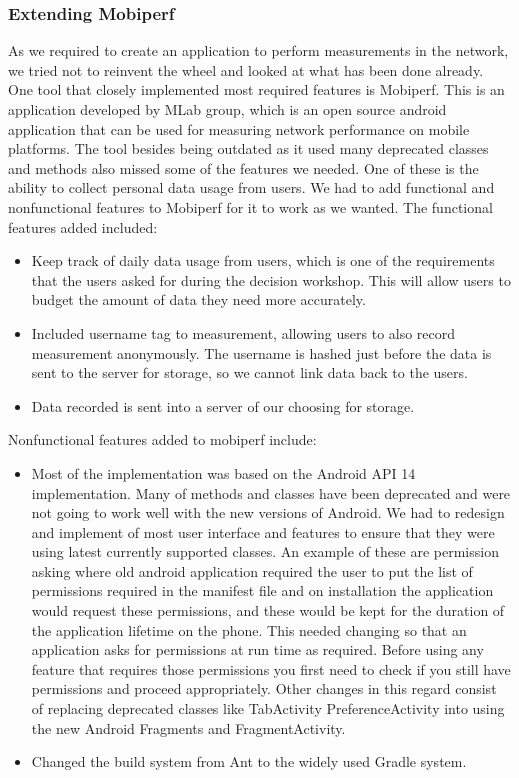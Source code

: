 \subsubsection{Extending Mobiperf}
As we required to create an application to perform measurements in the network, we tried not to reinvent the wheel and looked at what has been done already.
One tool that closely implemented most required features is Mobiperf\cite{mobiperf}.
This is an application developed by MLab group, which is an open source android application that can be used for measuring network performance on mobile platforms\cite{mobiperf}.
The tool besides being outdated as it used many deprecated classes and methods also missed some of the features we needed.
One of these is the ability to collect personal data usage from users.
We had to add functional and nonfunctional features to Mobiperf for it to work as we wanted.
The functional features added included:
\begin{itemize}
    \item Keep track of daily data usage from users, which is one of the requirements that the users asked for during the decision workshop.
    This will allow users to budget the amount of data they need more accurately.
    \item Included username tag to measurement, allowing users to also record measurement anonymously.
    The username is hashed just before the data is sent to the server for storage, so we cannot link data back to the users.
    \item Data recorded is sent into a server of our choosing for storage.
\end{itemize}
Nonfunctional features added to mobiperf include:
\begin{itemize}
    \item Most of the implementation was based on the Android API 14 implementation.
   Many of methods and classes have been deprecated and were not going to work well with the new versions of Android.
    We had to redesign and implement of most user interface and features to ensure that they were using latest currently supported classes.
    An example of these are permission asking where old android application required the user to put the list of permissions required in the manifest file and on installation the application would request these permissions, and these would be kept for the duration of the application lifetime on the phone.
    This needed changing so that an application asks for permissions at run time as required.
    Before using any feature that requires those permissions you first need to check if you still have permissions and proceed appropriately.
    Other changes in this regard consist of replacing deprecated classes like TabActivity PreferenceActivity into using the new Android Fragments and FragmentActivity.
    \item Changed the build system from Ant to the widely used Gradle system.
\end{itemize}
